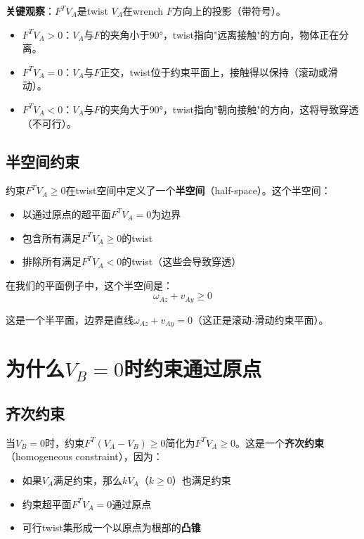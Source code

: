 \documentclass[12pt,a4paper]{article}
\begin{document}
\textbf{关键观察}：$F^T V_A$是twist $V_A$在wrench $F$方向上的投影（带符号）。

\begin{itemize}
\item \textbf{$F^T V_A > 0$}：$V_A$与$F$的夹角小于$90°$，twist指向"远离接触"的方向，物体正在分离。

\item \textbf{$F^T V_A = 0$}：$V_A$与$F$正交，twist位于约束平面上，接触得以保持（滚动或滑动）。

\item \textbf{$F^T V_A < 0$}：$V_A$与$F$的夹角大于$90°$，twist指向"朝向接触"的方向，这将导致穿透（不可行）。
\end{itemize}

\subsection{半空间约束}

约束$F^T V_A \geq 0$在twist空间中定义了一个\textbf{半空间}（half-space）。这个半空间：

\begin{itemize}
\item 以通过原点的超平面$F^T V_A = 0$为边界
\item 包含所有满足$F^T V_A \geq 0$的twist
\item 排除所有满足$F^T V_A < 0$的twist（这些会导致穿透）
\end{itemize}

在我们的平面例子中，这个半空间是：
\begin{equation}
\omega_{Az} + v_{Ay} \geq 0
\end{equation}

这是一个半平面，边界是直线$\omega_{Az} + v_{Ay} = 0$（这正是滚动-滑动约束平面）。

\section{为什么$V_B = 0$时约束通过原点}

\subsection{齐次约束}

当$V_B = 0$时，约束$F^T (V_A - V_B) \geq 0$简化为$F^T V_A \geq 0$。这是一个\textbf{齐次约束}（homogeneous constraint），因为：

\begin{itemize}
\item 如果$V_A$满足约束，那么$kV_A$（$k \geq 0$）也满足约束
\item 约束超平面$F^T V_A = 0$通过原点
\item 可行twist集形成一个以原点为根部的\textbf{凸锥}
\end{itemize}
\end{document}
